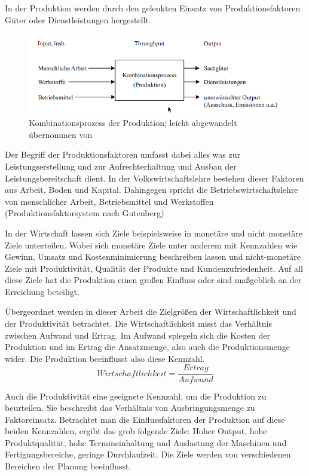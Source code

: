 \documentclass[a4paper,12pt, german]{report}
\begin{document}
In der Produktion werden durch den gelenkten Einsatz von Produktionsfaktoren Güter oder Dienstleistungen hergestellt. \cite{12}

\begin{figure}[H]
  \center
 \includegraphics[width=14cm]{images/Kombinationsprozess.png}
  \caption[Kombinationsprozess der Produktion]{Kombinationsprozess der Produktion; leicht abgewandelt übernommen von \cite{13} }
\end{figure}

Der Begriff der Produktionsfaktoren umfasst dabei alles was zur Leistungserstellung und zur Aufrechterhaltung und Ausbau der Leistungsbereitschaft dient. In der Volkswirtschaftslehre bestehen dieser Faktoren aus Arbeit, Boden und Kapital. Dahingegen spricht die Betriebswirtschaftslehre von menschlicher Arbeit, Betriebsmittel und Werkstoffen (Produktionsfaktorsystem nach Gutenberg)

In der Wirtschaft lassen sich Ziele beispielsweise in monetäre und nicht monetäre Ziele unterteilen. Wobei sich monetäre Ziele unter anderem mit Kennzahlen wie Gewinn, Umsatz und Kostenminimierung beschreiben lassen und nicht-monetäre Ziele mit Produktivität, Qualität der Produkte und Kundenzufriedenheit. Auf all diese Ziele hat die Produktion einen großen Einfluss oder sind maßgeblich an der Erreichung beteiligt.

Übergeordnet werden in dieser Arbeit die Zielgrößen der Wirtschaftlichkeit und der Produktivität betrachtet. Die Wirtschaftlichkeit misst das Verhältnis zwischen Aufwand und Ertrag. Im Aufwand spiegeln sich die Kosten der Produktion und im Ertrag die Ansatzmenge, also auch die Produktionsmenge wider. Die Produktion beeinflusst also diese Kennzahl.
\begin{equation}
  Wirtschaftlichkeit =\frac{Ertrag}{Aufwand}
\end{equation}

Auch die Produktivität eine geeignete Kennzahl, um die Produktion zu beurteilen. Sie beschreibt das Verhältnis von Ausbringungsmenge zu Faktoreinsatz. Betrachtet man die Einflussfaktoren der Produktion auf diese beiden Kennzahlen, ergibt das grob folgende Ziele: Hoher Output, hohe Produktqualität, hohe Termineinhaltung und Auslastung der Maschinen und Fertigungsbereiche, geringe Durchlaufzeit. Die Ziele werden von verschiedenen Bereichen der Planung beeinflusst.
\end{document}
